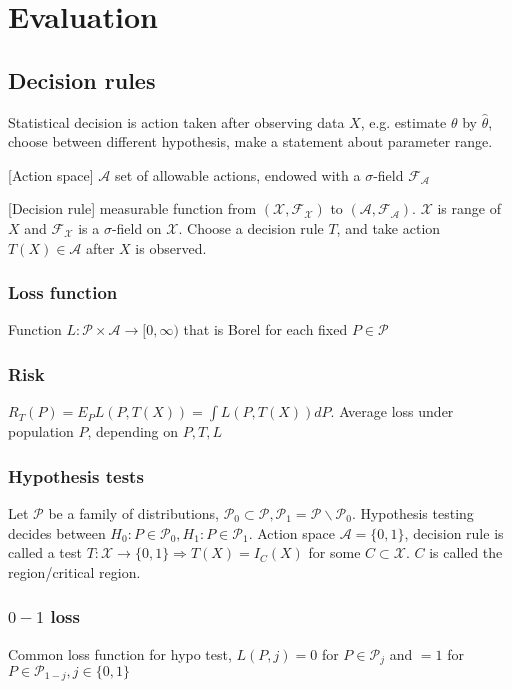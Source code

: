 \section{Evaluation}

\subsection{Decision rules}
Statistical decision is action taken after observing data $X$, e.g. estimate $\theta$ by $\hat\theta$, choose between different hypothesis, make a statement about parameter range.

[Action space] $\mathcal{A}$ set of allowable actions, endowed with a $\sigma$-field $\mathcal{F}_{\mathcal{A}}$

[Decision rule] measurable function from $(\mathcal{X}, \mathcal{F}_{\mathcal{X}})$ to $(\mathcal{A}, \mathcal{F}_{\mathcal{A}})$. $\mathcal{X}$ is range of $X$ and $\mathcal{F}_{\mathcal{X}}$ is a $\sigma$-field on $\mathcal{X}$.
Choose a decision rule $T$, and take action $T(X)\in\mathcal{A}$ after $X$ is observed.

\subsubsection{Loss function}
Function $L: \mathcal{P}\times \mathcal{A} \rightarrow [0, \infty)$ that is Borel for each fixed $P \in \mathcal{P}$

\subsubsection{Risk}

$R_T(P) = E_P L(P, T(X)) = \int L(P, T(X)) dP$. Average loss under population $P$, depending on $P, T, L$

\subsubsection{Hypothesis tests}

Let $\mathcal{P}$ be a family of distributions, $\mathcal{P}_0\subset\mathcal{P}, \mathcal{P}_1 = \mathcal{P}\backslash\mathcal{P}_0$. Hypothesis testing decides between $H_0: P \in \mathcal{P}_0, H_1: P \in \mathcal{P}_1$. Action space $\mathcal{A}= \{0, 1\}$, decision rule is called a test $T: \mathcal{X} \rightarrow \{0, 1\} \Rightarrow T(X) = I_C(X)$ for some $C \subset \mathcal{X}$. $C$ is called the region/critical region.

\subsubsection{$0-1$ loss}
Common loss function for hypo test, $L(P, j) = 0$ for $P\in\mathcal{P}_j$ and $=1$ for $P\in\mathcal{P}_{1-j}, j \in \{0, 1\}$

